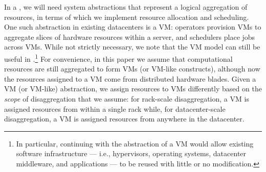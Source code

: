 In a \dis, we will need system abstractions that represent a logical aggregation of resources, in terms of which we implement resource allocation and scheduling. 
One such abstraction in existing datacenters is a VM: 
operators provision VMs to aggregate slices of hardware resources within a server, and schedulers place jobs across VMs. 
While not strictly necessary, we note that the VM model can still be useful in \dis.\footnote{In particular, continuing with the abstraction of a VM would allow existing software infrastructure --- i.e., hypervisors, operating systems, datacenter middleware, and applications --- to be reused with little or no modification.} 
For convenience, in this paper we assume that computational resources are still aggregated to form VMs (or VM-like constructs), although now the resources assigned to a VM come from distributed hardware blades. Given a VM (or VM-like) abstraction, we assign resources to VMs differently based on the \emph{scope} of disaggregation that we assume: for rack-scale disaggregation, a VM is assigned resources from within a single rack while, for datacenter-scale disaggregation, a VM is assigned resources from anywhere in the datacenter.

